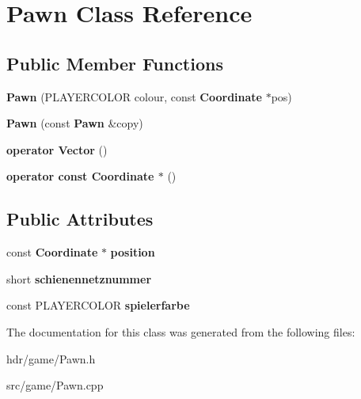 \section{Pawn Class Reference}
\label{class_pawn}
\subsection*{Public Member Functions}
\begin{DoxyCompactItemize}
\item 
{\bfseries Pawn} (P\-L\-A\-Y\-E\-R\-C\-O\-L\-O\-R colour, const {\bf Coordinate} $\ast$pos)\label{class_pawn_a9a79a9379034c3763ad24e83bc76aa6f}

\item 
{\bfseries Pawn} (const {\bf Pawn} \&copy)\label{class_pawn_a512724e66a28f71702973bcd87bd883b}

\item 
{\bfseries operator Vector} ()\label{class_pawn_ab6b390dfea31278ba595d533965e19b9}

\item 
{\bfseries operator const Coordinate $\ast$} ()\label{class_pawn_ad17fd7ed0dadac386aaa0a00a039f9ea}

\end{DoxyCompactItemize}
\subsection*{Public Attributes}
\begin{DoxyCompactItemize}
\item 
const {\bf Coordinate} $\ast$ {\bfseries position}\label{class_pawn_a92aa2a9cdd9adc5ebb5d79f61e2a7e51}

\item 
short {\bfseries schienennetznummer}\label{class_pawn_a8f02932d671c756305cbe3959104d5bf}

\item 
const P\-L\-A\-Y\-E\-R\-C\-O\-L\-O\-R {\bfseries spielerfarbe}\label{class_pawn_a5e5204e3877b774744df1b5aeca2fb92}

\end{DoxyCompactItemize}


The documentation for this class was generated from the following files\-:\begin{DoxyCompactItemize}
\item 
hdr/game/Pawn.\-h\item 
src/game/Pawn.\-cpp\end{DoxyCompactItemize}
